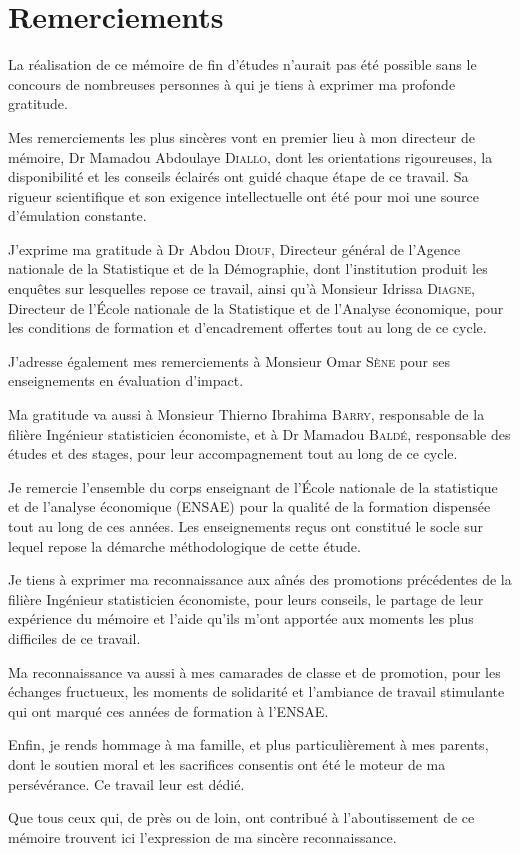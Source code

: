 \section*{Remerciements}

La réalisation de ce mémoire de fin d'études n'aurait pas été possible sans
le concours de nombreuses personnes à qui je tiens à exprimer ma profonde
gratitude.

Mes remerciements les plus sincères vont en premier lieu à mon directeur de
mémoire, Dr Mamadou Abdoulaye \textsc{Diallo}, dont les orientations
rigoureuses, la disponibilité et les conseils éclairés ont guidé chaque étape
de ce travail. Sa rigueur scientifique et son exigence intellectuelle ont été
pour moi une source d'émulation constante.

J'exprime ma gratitude à Dr Abdou \textsc{Diouf}, Directeur général de l'Agence
nationale de la Statistique et de la Démographie, dont l'institution produit les
enquêtes sur lesquelles repose ce travail, ainsi qu'à Monsieur Idrissa \textsc{Diagne}, Directeur de l'École nationale de
la Statistique et de l'Analyse économique, pour les conditions de formation et
d'encadrement offertes tout au long de ce cycle.

J'adresse également mes remerciements à Monsieur Omar \textsc{Sène} pour ses
enseignements en évaluation d'impact.

Ma gratitude va aussi à Monsieur Thierno Ibrahima \textsc{Barry}, responsable
de la filière Ingénieur statisticien économiste, et à Dr Mamadou
\textsc{Baldé}, responsable des études et des stages, pour leur accompagnement
tout au long de ce cycle.

Je remercie l'ensemble du corps enseignant de l'École nationale de la
statistique et de l'analyse économique (ENSAE) pour la qualité
de la formation dispensée tout au long de ces années. Les enseignements reçus
ont constitué le socle sur lequel repose la démarche méthodologique de cette
étude.

Je tiens à exprimer ma reconnaissance aux aînés des promotions précédentes de
la filière Ingénieur statisticien économiste, pour leurs conseils, le partage
de leur expérience du mémoire et l'aide qu'ils m'ont apportée aux moments les
plus difficiles de ce travail.

Ma reconnaissance va aussi à mes camarades de classe et de
promotion, pour les échanges fructueux, les moments de solidarité et
l'ambiance de travail stimulante qui ont marqué ces années de formation à
l'ENSAE.

Enfin, je rends hommage à ma famille, et plus particulièrement à mes parents,
dont le soutien moral et les sacrifices consentis ont été le moteur de ma
persévérance. Ce travail leur est dédié.

Que tous ceux qui, de près ou de loin, ont contribué à l'aboutissement de
ce mémoire trouvent ici l'expression de ma sincère reconnaissance.
